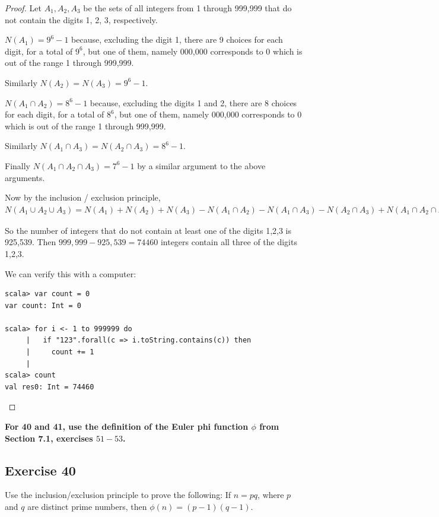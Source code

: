 \documentclass[14pt]{extarticle}
\newcommand{\cy}{\color{cyan}}
\begin{document}
\begin{proof}
Let \(A_1, A_2, A_3\) be the sets of all integers from 1 through 999,999 that do not contain the digits 1, 2, 3,
respectively.

\(N(A_1) = 9^6 - 1\) because, excluding the digit 1, there are 9 choices for each digit, for a total of \(9^6\), but
one of them, namely 000,000 corresponds to 0 which is out of the range 1 through 999,999.

Similarly \(N(A_2) = N(A_3) = 9^6-1\).

\(N(A_1 \cap A_2) = 8^6 - 1\) because, excluding the digits 1 and 2, there are 8 choices for each digit, for a total of 
\(8^6\), but one of them, namely 000,000 corresponds to 0 which is out of the range 1 through 999,999.

Similarly \(N(A_1 \cap A_3) = N(A_2 \cap A_3) = 8^6 - 1\).

Finally \(N(A_1 \cap A_2 \cap A_3) = 7^6-1\) by a similar argument to the above arguments. 

Now by the inclusion / exclusion principle, \(N(A_1 \cup A_2 \cup A_3) = N(A_1) + N(A_2) + N(A_3) - N(A_1 \cap A_2) 
- N(A_1 \cap A_3) - N(A_2 \cap A_3) + N(A_1 \cap A_2 \cap A_3) = 3(9^6-1) - 3(8^6-1) + 7^6-1 = 925,539\)

So the number of integers that do not contain at least one of the digits 1,2,3 is 925,539. Then \(999,999 - 925,539 = 
74460\) integers contain all three of the digits 1,2,3.

We can verify this with a computer:
\begin{verbatim}
scala> var count = 0
var count: Int = 0
                                                                                                                        
scala> for i <- 1 to 999999 do
     |   if "123".forall(c => i.toString.contains(c)) then
     |     count += 1
     | 
scala> count
val res0: Int = 74460
\end{verbatim}
\end{proof}

{\bf \cy For 40 and 41, use the definition of the Euler phi function \(\phi\) from Section 7.1, exercises $51-53$.}

\subsection{Exercise 40}
Use the inclusion/exclusion principle to prove the following: If \(n = pq\), where $p$ and $q$ are distinct prime numbers, then \(\phi(n) = (p - 1)(q - 1)\).
\end{document}
